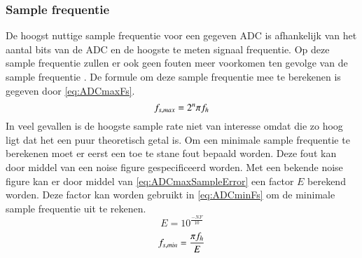 \subsubsection{Sample frequentie}\label{sec:ADC:sampleFreq}
De hoogst nuttige sample frequentie voor een gegeven ADC is afhankelijk van het aantal bits van de ADC en de hoogste te meten signaal frequentie. Op deze sample frequentie zullen er ook geen fouten meer voorkomen ten gevolge van de sample frequentie \cite{MJHcalcADC}. De formule om deze sample frequentie mee te berekenen is gegeven door \cref{eq:ADCmaxFs}.
\begin{equation}\label{eq:ADCmaxFs}
    f_{s,max}=2^n\pi f_h
    \tagaddtext{[\si{\hertz}]}
\end{equation}
In veel gevallen is de hoogste sample rate niet van interesse omdat die zo hoog ligt dat het een puur theoretisch getal is. Om een minimale sample frequentie te berekenen moet er eerst een toe te stane fout bepaald worden. Deze fout kan door middel van een noise figure gespecificeerd worden. Met een bekende noise figure kan er door middel van \cref{eq:ADCmaxSampleError} een factor $E$ berekend worden. Deze factor kan worden gebruikt in \cref{eq:ADCminFs} om de minimale sample frequentie uit te rekenen.
\begin{equation}\label{eq:ADCmaxSampleError}
    E=10^{\frac{-NF}{10}}
\end{equation}
\begin{equation}\label{eq:ADCminFs}
    f_{s,min}=\frac{\pi f_h}{E}
    \tagaddtext{[\si{\hertz}]}
\end{equation}